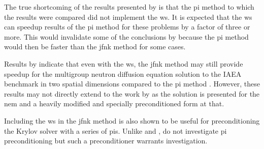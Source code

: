       The true shortcoming of the results presented by \citeauthor{qe2paper} is
      that the \gls{pi} method to which the results were compared did not
      implement the \gls{ws}. It is expected that the \gls{ws} can speedup
      results of the \gls{pi} method for these problems by a factor of three or
      more. This would invalidate some of the conclusions by
      \citeauthor{qe2paper} because the \gls{pi} method would then be faster
      than the \gls{jfnk} method for some cases.

      Results by \citeauthor{jfnk_wielandt} indicate that even with the
      \gls{ws}, the \gls{jfnk} method may still provide speedup for the
      multigroup neutron diffusion equation solution to the IAEA benchmark in
      two spatial dimensions compared to the \gls{pi} method
      \cite{jfnk_wielandt}. However, these results may not directly extend to
      the work by \citeauthor{qe2paper} as the solution is presented for the
      \gls{nem} and a heavily modified and specially preconditioned form at
      that.

      Including the \gls{ws} in the \gls{jfnk} method is also shown to be useful
      for preconditioning the Krylov solver with a series of \glspl{pi}. Unlike
      \citeauthor{gill_azmy} and \citeauthor{jfnk_wielandt},
      \citeauthor{qe2paper} do not investigate \gls{pi} preconditioning but such
      a preconditioner warrants investigation.
